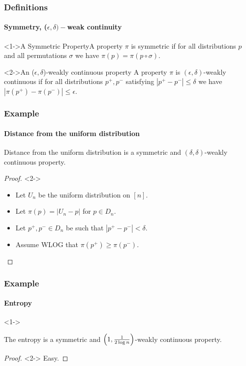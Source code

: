 \documentclass{beamer}
\begin{document}
\begin{frame}
  \frametitle{Definitions}
  \framesubtitle{Symmetry, ($\epsilon,\delta)-$weak continuity}

  \begin{block}<1->{A Symmetric Property}A property $\pi$ is symmetric if
    for all distributions $p$ and all permutations $\sigma$ we have
    $\pi(p)=\pi(p\circ\sigma)$.
  \end{block}

  \begin{block}<2->{An ($\epsilon, \delta$)-weakly continuous property}
    A property $\pi$ is $(\epsilon,\delta)$-weakly continuous if for
    all distributions $p^+,p^-$ satisfying $|p^+-p^-|\le\delta$ we
    have $|\pi(p^+)-\pi(p^-)|\le \epsilon$.
  \end{block}
\end{frame}

\begin{frame}
  \frametitle{Example} \framesubtitle{Distance from the uniform
    distribution}
  \begin{theorem}
    Distance from the uniform distribution is a symmetric and
    $(\delta, \delta)$-weakly continuous property.
  \end{theorem}
  \begin{proof}<2->
    \begin{itemize}
    \item Let $U_n$ be the uniform distribution on $[n]$.
    \item Let $\pi(p)=|U_n-p|$ for $p\in D_n$.
    \item Let $p^+,p^-\in D_n$ be such that $|p^+-p^-|<\delta$.
    \item Assume WLOG that $\pi(p^+) \geq \pi(p^-)$.
    \end{itemize}
  \end{proof}
\end{frame}

\begin{frame}
  \frametitle{Example} \framesubtitle{Entropy}
  \begin{theorem}<1->

    The entropy is a symmetric and $\left(1,{1\over 2\log
        n}\right)$-weakly continuous property.
  \end{theorem}
  \begin{proof}<2->
    Easy.
  \end{proof}
\end{frame}
\end{document}
